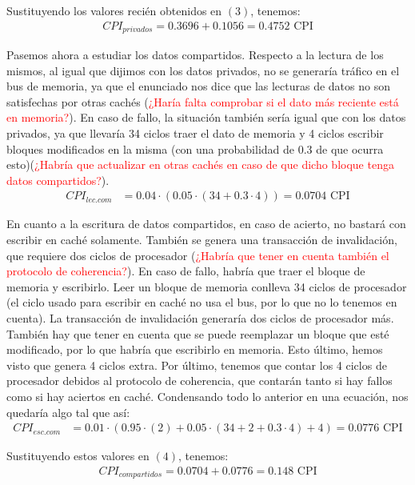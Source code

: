 \documentclass[12pt,a4paper]{article}
\begin{document}
Sustituyendo los valores recién obtenidos en $(3)$, tenemos:
\begin{align*}
CPI_{privados}=0.3696+0.1056=0.4752 \text{ CPI}
\end{align*}

Pasemos ahora a estudiar los datos compartidos. Respecto a la lectura de los mismos, al igual que dijimos con los datos privados, no se generaría tráfico en el bus de memoria, ya que el enunciado nos dice que las lecturas de datos no son satisfechas por otras cachés (\textcolor{red}{¿Haría falta comprobar si el dato más reciente está en memoria?}). En caso de fallo, la situación también sería igual que con los datos privados, ya que llevaría 34 ciclos traer el dato de memoria y 4 ciclos escribir bloques modificados en la misma (con una probabilidad de 0.3 de que ocurra esto)(\textcolor{red}{¿Habría que actualizar en otras cachés en caso de que dicho bloque tenga datos compartidos?}).
\begin{align*}
CPI_{lec.com}&=0.04\cdot (0.05\cdot (34 + 0.3\cdot 4))=0.0704\text{ CPI}
\end{align*}

En cuanto a la escritura de datos compartidos, en caso de acierto, no bastará con escribir en caché solamente. También se genera una transacción de invalidación, que requiere dos ciclos de procesador (\textcolor{red}{¿Habría que tener en cuenta también el protocolo de coherencia?}). En caso de fallo, habría que traer el bloque de memoria y escribirlo. Leer un bloque de memoria conlleva 34 ciclos de procesador (el ciclo usado para escribir en caché no usa el bus, por lo que no lo tenemos en cuenta). La transacción de invalidación generaría dos ciclos de procesador más. También hay que tener en cuenta que se puede reemplazar un bloque que esté modificado, por lo que habría que escribirlo en memoria. Esto último, hemos visto que genera 4 ciclos extra. Por último, tenemos que contar los 4 ciclos de procesador debidos al protocolo de coherencia, que contarán tanto si hay fallos como si hay aciertos en caché. Condensando todo lo anterior en una ecuación, nos quedaría algo tal que así:
\begin{align*}
CPI_{esc.com}&=0.01\cdot (0.95\cdot (2) + 0.05\cdot (34+2+0.3\cdot 4)+4)=0.0776\text{ CPI}
\end{align*}

Sustituyendo estos valores en $(4)$, tenemos:
\begin{align*}
CPI_{compartidos}=0.0704+0.0776=0.148 \text{ CPI}
\end{align*}
\end{document}
